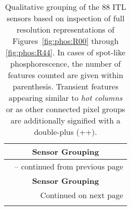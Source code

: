 \begin{center}
\begin{longtable}{lll}
\caption[Qualitative grouping of ITL sensors]{
    Qualitative grouping of the 88 ITL sensors based on inspection of full resolution representations 
    of Figures~\ref{fig:phos:R00} through \ref{fig:phos:R44}. In cases of spot-like phosphorescence, 
    the number of features counted are given within parenthesis. Transient features appearing similar to 
    \textit{hot columns} or as other connected pixel groups are additionally signified with a double-plus (++).
} \label{qualitative_assessment:itl_sensors} \\
\toprule
\multicolumn{3}{c}{\textbf{Sensor Grouping}} \\
\midrule
\endfirsthead

\multicolumn{3}{c}{{\tablename\ \thetable{} -- continued from previous page}} \\
\toprule
\multicolumn{3}{c}{\textbf{Sensor Grouping}} \\
\midrule
\endhead

\midrule
\multicolumn{3}{r}{{Continued on next page}} \\
\bottomrule
\endfoot

\bottomrule
\endlastfoot


\end{longtable}
\end{center}
